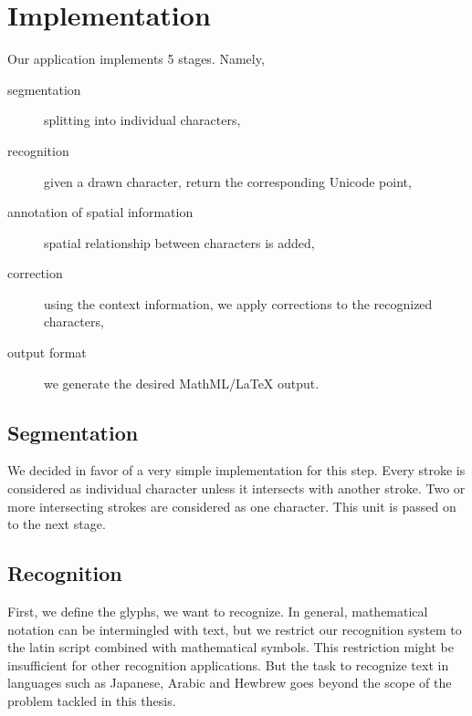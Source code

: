 \section{Implementation}
\label{sec:implementation}
%
Our application implements 5 stages. Namely,
\begin{description}
\item[segmentation] splitting into individual characters,
\item[recognition] given a drawn character, return the corresponding Unicode point,
\item[annotation of spatial information] spatial relationship between characters is added,
\item[correction] using the context information, we apply corrections to the recognized characters,
\item[output format] we generate the desired MathML/\LaTeX{} output.
\end{description}

\subsection{Segmentation}
\label{sec:impl-segmentation}
%
We decided in favor of a very simple implementation for this step.
Every stroke is considered as individual character unless it intersects with another stroke.
Two or more intersecting strokes are considered as one character.
This unit is passed on to the next stage.

\subsection{Recognition}
\label{sec:impl-recognition}
%
First, we define the glyphs, we want to recognize. In general, mathematical notation can be intermingled with text,
but we restrict our recognition system to the latin script combined with mathematical symbols. This restriction might
be insufficient for other recognition applications. But the task to recognize text in languages such as Japanese, Arabic
and Hewbrew goes beyond the scope of the problem tackled in this thesis.

